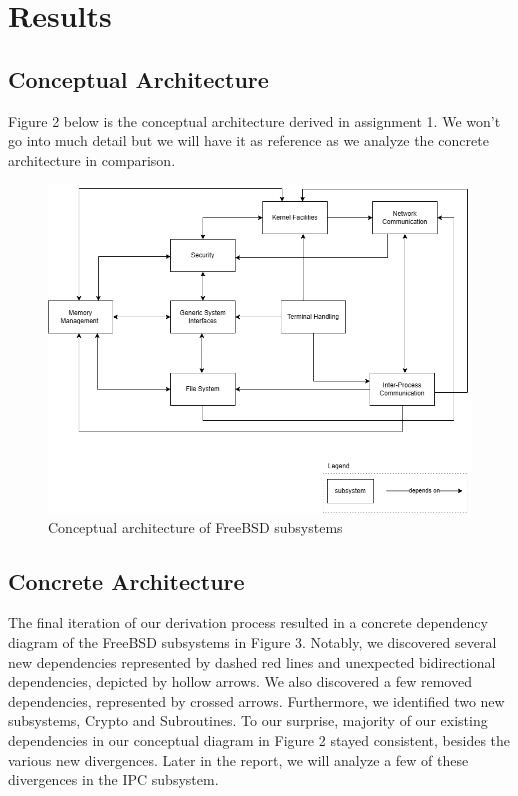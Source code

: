 \documentclass[12pt, dvipsnames, a4paper]{article}
\begin{document}
\section{Results}
\subsection{Conceptual Architecture}
Figure 2 below is the conceptual architecture derived in assignment 1. We won't go into much detail but we will have it as reference as we analyze the concrete architecture in comparison.

\begin{figure}[!htb]
	\center
	\includegraphics[width = 390pt]{assets/conceptual-architecture.png}
	\caption{Conceptual architecture of FreeBSD subsystems}
\end{figure}
\subsection{Concrete Architecture}

The final iteration of our derivation process resulted in a concrete dependency diagram of the FreeBSD subsystems in Figure 3. Notably, we discovered several new dependencies represented by dashed red lines and unexpected bidirectional dependencies, depicted by hollow arrows. We also discovered a few removed dependencies, represented by crossed arrows. Furthermore, we identified two new subsystems, Crypto and Subroutines. To our surprise, majority of our existing dependencies in our conceptual diagram in Figure 2 stayed consistent, besides the various new divergences. Later in the report, we will analyze a few of these divergences in the IPC subsystem.
\end{document}
